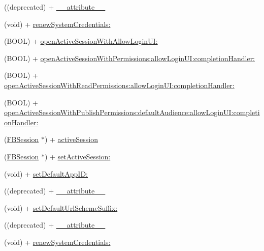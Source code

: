 \begin{DoxyCompactItemize}
\item 
((deprecated) + \hyperlink{interfaceFBSession_aab7b90337909b905920a4067b5253c2b}{\+\_\+\+\_\+attribute\+\_\+\+\_\+}
\item 
(void) + \hyperlink{interfaceFBSession_a3b4d7c16af36ea5690d19bf77065dfaf}{renew\+System\+Credentials\+:}
\item 
(B\+O\+OL) + \hyperlink{interfaceFBSession_abe6b20f6e3202521b7ecb4115c8e865d}{open\+Active\+Session\+With\+Allow\+Login\+U\+I\+:}
\item 
(B\+O\+OL) + \hyperlink{interfaceFBSession_ac90957d41f538f96b5d8c9087ad3ad2d}{open\+Active\+Session\+With\+Permissions\+:allow\+Login\+U\+I\+:completion\+Handler\+:}
\item 
(B\+O\+OL) + \hyperlink{interfaceFBSession_add12d4669d7e770d8fedeab148ca5dd9}{open\+Active\+Session\+With\+Read\+Permissions\+:allow\+Login\+U\+I\+:completion\+Handler\+:}
\item 
(B\+O\+OL) + \hyperlink{interfaceFBSession_a727a1541ad09287fb613a018e100534d}{open\+Active\+Session\+With\+Publish\+Permissions\+:default\+Audience\+:allow\+Login\+U\+I\+:completion\+Handler\+:}
\item 
(\hyperlink{interfaceFBSession}{F\+B\+Session} $\ast$) + \hyperlink{interfaceFBSession_aaf6863ab39e2f67733792453874d3870}{active\+Session}
\item 
(\hyperlink{interfaceFBSession}{F\+B\+Session} $\ast$) + \hyperlink{interfaceFBSession_af1b30bea1e3251f8d75f76b10369756e}{set\+Active\+Session\+:}
\item 
(void) + \hyperlink{interfaceFBSession_afb4f41ffcd4d824a16147cb41b932a32}{set\+Default\+App\+I\+D\+:}
\item 
((deprecated) + \hyperlink{interfaceFBSession_aab7b90337909b905920a4067b5253c2b}{\+\_\+\+\_\+attribute\+\_\+\+\_\+}
\item 
(void) + \hyperlink{interfaceFBSession_ac3d4f0df3cae8fe5091b9d98b9f166d4}{set\+Default\+Url\+Scheme\+Suffix\+:}
\item 
((deprecated) + \hyperlink{interfaceFBSession_aab7b90337909b905920a4067b5253c2b}{\+\_\+\+\_\+attribute\+\_\+\+\_\+}
\item 
(void) + \hyperlink{interfaceFBSession_a3b4d7c16af36ea5690d19bf77065dfaf}{renew\+System\+Credentials\+:}
\end{DoxyCompactItemize}
